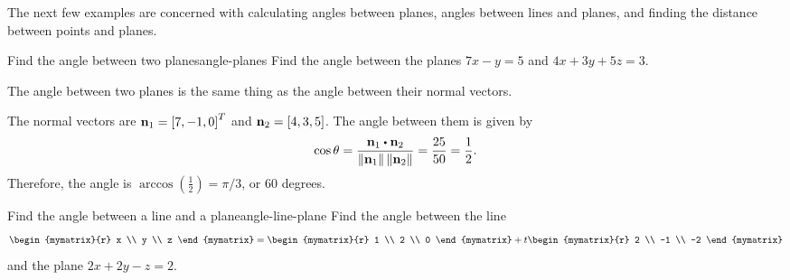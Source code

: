 The next few examples are concerned with calculating angles between
planes, angles between lines and planes, and finding the distance
between points and planes.

\begin{example}{Find the angle between two planes}{angle-planes}
  Find the angle between the planes $7x-y=5$ and $4x+3y+5z=3$.
\end{example}

\begin{solution}
  The angle between two planes is the same thing as the angle between
  their normal vectors.
  \begin{center}
  \end{center}
  The normal vectors are $\mbox{\bf n}_1 = \left[7,-1,0\right]^T$ and $\mbox{\bf n}_2
  = \left[4,3,5\right]$. The angle between them is given by
    \begin{equation*}
    \cos\theta =
    \frac{\vect{n}_1\dotprod\vect{n}_2}{\norm{\vect{n}_1}\norm{\vect{n}_2}}
    = \frac{25}{50} = \frac{1}{2}.
  \end{equation*}
  Therefore, the angle is $\arccos(\frac{1}{2}) = \pi/3$, or 60 degrees.
\end{solution}

\begin{example}{Find the angle between a line and a plane}{angle-line-plane}
  Find the angle between the line
  \begin{equation*}
    \begin{mymatrix}{r} x \\ y \\ z \end{mymatrix}
    = \begin{mymatrix}{r} 1 \\ 2 \\ 0 \end{mymatrix}
    + t \begin{mymatrix}{r} 2 \\ -1 \\ -2 \end{mymatrix}
  \end{equation*}
  and the plane $2x+2y-z = 2$.
\end{example}

